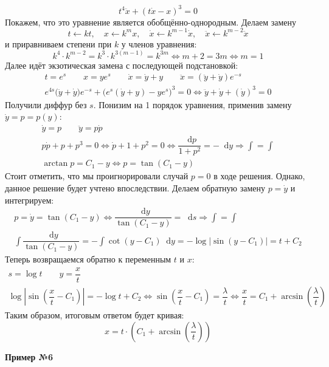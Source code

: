 \documentclass[a4paper,12pt]{article}
\renewcommand*\d{\mathop{}\!\mathrm{d}}
\newcommand{\dy}{\dot{y}}
\newcommand{\ddy}{\ddot{y}}
\newcommand{\dpp}{\dot{p}}
\newcommand{\dx}{\dot{x}}
\newcommand{\ddx}{\ddot{x}}
\newcommand{\bto}{\Longrightarrow}
\newcommand{\ds}{\displaystyle}
\begin{document}
\[t^4\ddx + (t\dx - x)^3 = 0\]
Покажем, что это уравнение является обобщённо-однородным. Делаем замену
\[t\leftarrow kt,\quad x \leftarrow k^mx,\quad \dx \leftarrow k^{m - 1}\dx,\quad \ddx \leftarrow k^{m - 2}\ddx\]
и приравниваем степени при $k$ у членов уравнения:
\[k^4\cdot k^{m - 2} = k^{3} \cdot k^{3(m - 1)} = k^{3m} \iff m + 2 = 3m \iff m = 1\]
Далее идёт экзотическая замена с последующей подстановкой:
\begin{gather*}
	t = e^s\qquad x = ye^s \qquad \dx = \dy + y \qquad \ddx = \left(\ddy + \dy\right)e^{-s}\\
	e^{4s}\big(\ddy + \dy\big)e^{-s} + \big(e^s(\dy + y) - ye^s\big)^3 = 0 \iff \ddy + \dy + (\dy)^3 = 0
\end{gather*}
Получили диффур без $s$. Понизим на 1 порядок уравнения, применив замену $\dy = p = p(y)$:
\begin{gather*}
	\dy = p \qquad \ddy = p\dpp\\
	p\dpp + p + p^3 = 0 \iff \dpp + 1 + p^2 = 0 \iff \dfrac{\d p}{1 + p^2} = -\d y \bto \ds\int = \int\\
	\arctan p = C_1 - y \iff p = \tan(C_1 - y)
\end{gather*}
Стоит отметить, что мы проигнорировали случай $p = 0$ в ходе решения. Однако, данное решение будет учтено впоследствии. Делаем обратную замену $p = \dy$ и интегрируем:
\begin{gather*}
	p = \dy = \tan(C_1 - y) \iff \dfrac{\d y}{\tan(C_1 - y)} = \d s \bto \ds\int = \int\\
	\ds\int \dfrac{\d y}{\tan(C_1 - y)} = -\ds\int \cot(y - C_1)\d y = -\log\big|\sin(y - C_1)\big| = t + C_2
\end{gather*}
Теперь возвращаемся обратно к переменным $t$ и $x$:
\begin{gather*}
	s = \log t \qquad y = \dfrac{x}{t}\\
	\log\left|\sin(\dfrac{x}{t} - C_1)\right| = -\log t + C_2 \iff \sin(\dfrac{x}{t} - C_1) = \dfrac{\lambda}{t} \iff \dfrac{x}{t} = C_1 + \arcsin(\dfrac{\lambda}{t}) 
\end{gather*}
Таким образом, итоговым ответом будет кривая:
\[x = t \cdot \left(C_1 + \arcsin(\dfrac{\lambda}{t}) \right)\]

\textbf{Пример №6}
\end{document}
